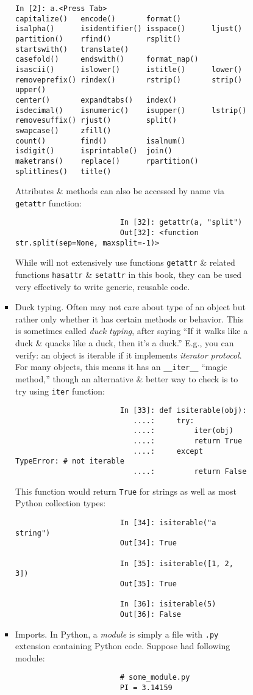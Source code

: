 \documentclass{article}
\begin{document}
\begin{enumerate}
\begin{itemize}
\begin{itemize}
\begin{itemize}
\begin{itemize}
\begin{verbatim}
In [2]: a.<Press Tab>
capitalize()   encode()       format()       isalpha()      isidentifier() isspace()      ljust()        partition()    rfind()        rsplit()       startswith()   translate()   
casefold()     endswith()     format_map()   isascii()      islower()      istitle()      lower()        removeprefix() rindex()       rstrip()       strip()        upper()       
center()       expandtabs()   index()        isdecimal()    isnumeric()    isupper()      lstrip()       removesuffix() rjust()        split()        swapcase()     zfill()       
count()        find()         isalnum()      isdigit()      isprintable()  join()         maketrans()    replace()      rpartition()   splitlines()   title()                      
					\end{verbatim}
					Attributes \& methods can also be accessed by name via {\tt getattr} function:
					\begin{verbatim}
						In [32]: getattr(a, "split")
						Out[32]: <function str.split(sep=None, maxsplit=-1)>
					\end{verbatim}
					While will not extensively use functions {\tt getattr} \& related functions {\tt hasattr} \& {\tt setattr} in this book, they can be used very effectively to write generic, reusable code.
					\item {\sf Duck typing.} Often may not care about type of an object but rather only whether it has certain methods or behavior. This is sometimes called {\it duck typing}, after saying ``If it walks like a duck \& quacks like a duck, then it's a duck.'' E.g., you can verify: an object is iterable if it implements {\it iterator protocol}. For many objects, this means it has an \verb|__iter__| ``magic method,'' though an alternative \& better way to check is to try using {\tt iter} function:
					\begin{verbatim}
						In [33]: def isiterable(obj):
						   ....:     try:
						   ....:         iter(obj)
						   ....:         return True
						   ....:     except TypeError: # not iterable
						   ....:         return False
					\end{verbatim}
					This function would return {\tt True} for strings as well as most Python collection types:
					\begin{verbatim}
						In [34]: isiterable("a string")
						Out[34]: True
						
						In [35]: isiterable([1, 2, 3])
						Out[35]: True
						
						In [36]: isiterable(5)
						Out[36]: False
					\end{verbatim}
					\item {\sf Imports.} In Python, a {\it module} is simply a file with {\tt.py} extension containing Python code. Suppose had following module:
					\begin{verbatim}
						# some_module.py
						PI = 3.14159
						

\end{verbatim}
\end{itemize}
\end{itemize}
\end{itemize}
\end{itemize}
\end{enumerate}
\end{document}
